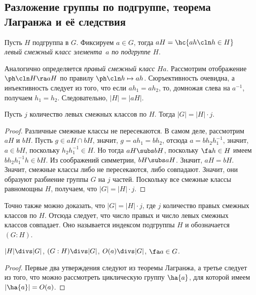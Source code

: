 \documentclass[a4paper]{article}
\begin{document}
\subsection{Разложение группы по подгруппе, теорема Лагранжа и её следствия}

\begin{df}
Пусть $H$ подгруппа в $G$. Фиксируем $a \in G$, тогда $aH=\hc{ah\cln h \in H}$ \emph{левый
смежный класс элемента~$a$ по подгруппе $H$}.
\end{df}

Аналогично определяется \emph{правый смежный класс} $Ha$. Рассмотрим отображение $\ph\cln H \ra aH$ по
правилу $\ph\cln h \mapsto ah$. Сюръективность очевидна, а инъективность следует из того, что
если $ah_1=ah_2$, то, домножая слева на $a^{-1}$, получаем $h_1=h_2$. Следовательно, $|H| =|aH|$.

\begin{theorem}[Лагранжа]
Пусть $j$ количество левых смежных классов по $H$. Тогда $|G|=|H| \cdot j$.
\end{theorem}
\begin{proof}
Различные смежные классы не пересекаются. В самом деле, рассмотрим $aH$ и $bH$.  Пусть $g \in aH \cap bH$,
значит, $g=ah_1=bh_2$, отсюда $a = bh_2h_1^{-1}$, значит, $a \in bH$, поскольку $h_2h_1^{-1} \in H$. Но тогда
$aH \subs bH$, поскольку $\fa h \in H$ имеем $bh_2h_1^{-1}h \in bH$. Из соображений симметрии, $bH \subs aH$.
Значит, $aH=bH$. Значит, смежные классы либо не пересекаются, либо совпадают. Значит, они образуют разбиение
группы $G$ на $j$ частей. Поскольку все смежные классы равномощны $H$, получаем, что $|G|=|H|\cdot j$.
\end{proof}

\begin{note}
Точно также можно доказать, что $|G| = |H| \cdot j$, где $j$ количество правых  смежных классов по $H$.
Отсюда следует, что число правых и число левых смежных классов совпадает. Оно называется индексом подгруппы
$H$ и обозначается $(G:H)$.
\end{note}

\begin{imp}
$|H| \divs |G|$, $(G:H) \divs |G|$, $O(a) \divs |G|$, $\fa a \in G$.
\end{imp}
\begin{proof}
Первые два утверждения следуют из теоремы Лагранжа, а третье следует из того, что  можно рассмотреть
циклическую группу $\ha{a}$, для которой имеем $|\ha{a}|=O(a)$.
\end{proof}
\end{document}
